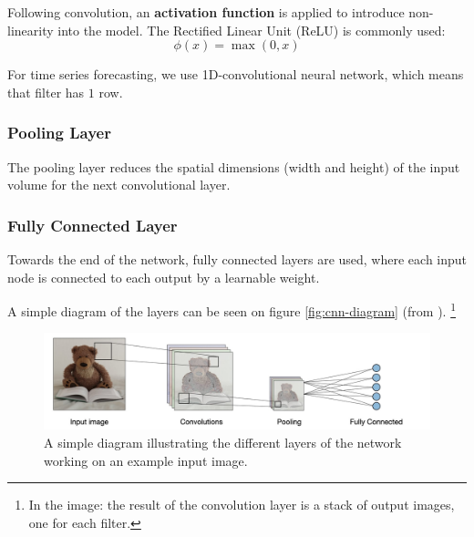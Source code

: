 Following convolution, an \textbf{activation function} is applied to introduce non-linearity into the model. The Rectified Linear Unit (ReLU) \label{relu} is commonly used:
\[\phi(x) = \max(0, x)\]

For time series forecasting, we use 1D-convolutional neural network, which means that filter has \(1\) row.


\subsubsection{Pooling Layer}
The pooling layer reduces the spatial dimensions (width and height) of the input volume for the next convolutional layer.

\subsubsection{Fully Connected Layer}
Towards the end of the network, fully connected layers are used, where each input node is connected to each output by a learnable weight.

A simple diagram of the layers can be seen on figure \autoref{fig:cnn-diagram} (from \cite{cnn_diagram_source}). \footnote{In the image: the result of the convolution layer is a stack of output images, one for each filter.}

\begin{figure}[h!]
	\centering
	\includegraphics[width=0.5\linewidth]{"pictures/architecture-cnn-en.jpeg"}
	\caption{A simple diagram illustrating the different layers of the network working on an example input image.}
	\label{fig:cnn-diagram}

\end{figure}







